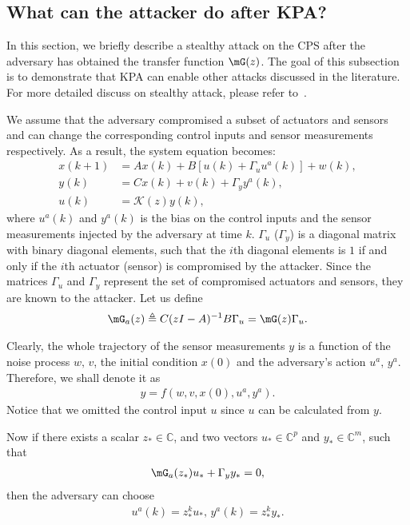   \subsection{What can the attacker do after KPA?}
  \label{sec:stealthy}
  In this section, we briefly describe a stealthy attack on the CPS after the adversary has obtained the transfer function $\mG(z)$. The goal of this subsection is to demonstrate that KPA can enable other attacks discussed in the literature. For more detailed discuss on stealthy attack, please refer to~\cite{Pasqualetti_2013}. 

  We assume that the adversary compromised a subset of actuators and sensors and can change the corresponding control inputs and sensor measurements respectively. As a result, the system equation becomes:
  \begin{align*}
    x(k+1) &= Ax(k) + B\left[u(k) + \Gamma_u u^a(k)\right]+w(k),\\
    y(k) &= Cx(k) + v(k) + \Gamma_y y^a(k),\\
    u(k) &= \mathcal K(z)y(k),
  \end{align*}
  where $u^a(k)$ and $y^a(k)$ is the bias on the control inputs and the sensor measurements injected by the adversary at time $k$. $\Gamma_u$ ($\Gamma_y$) is a diagonal matrix with binary diagonal elements, such that the $i$th diagonal elements is $1$ if and only if the $i$th actuator (sensor) is compromised by the attacker. Since the matrices $\Gamma_u$ and $\Gamma_y$ represent the set of compromised actuators and sensors, they are known to the attacker. Let us define
  \begin{align*}
    \mG_a(z) \triangleq C(zI-A)^{-1}B\Gamma_u = \mG(z)\Gamma_u. 
  \end{align*}

  Clearly, the whole trajectory of the sensor measurements $y$ is a function of the noise process $w,\,v$, the initial condition $x(0)$ and the adversary's action $u^a,\,y^a$. Therefore, we shall denote it as 
  \begin{align*}
    y = f(w,v,x(0),u^a,y^a). 
  \end{align*}
  Notice that we omitted the control input $u$ since $u$ can be calculated from $y$.

  Now if there exists a scalar $z_*\in \mathbb C$, and two vectors $u_*\in \mathbb C^p$ and $y_*\in \mathbb C^m$, such that
  \begin{align*}
    \mG_a(z_*)u_* + \Gamma_y y_* = 0,
  \end{align*}
  then the adversary can choose
  \begin{align}
    u^a(k) = z_*^k u_*,\,y^a(k) = z_*^k y_*.
    \label{eq:stealthyinput}
  \end{align}

